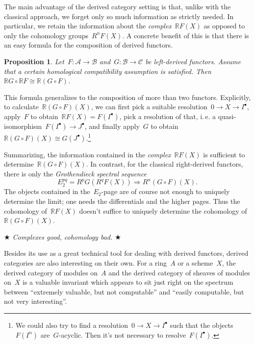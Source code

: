\documentclass{amsart}
\makeatletter
\theoremstyle{definition}
\theoremstyle{plain}
\newtheorem{prop}[defn]{Proposition}
\theoremstyle{remark}
\newcommand{\A}{\mathcal{A}}
\newcommand{\B}{\mathcal{B}}
\newcommand{\C}{\mathcal{C}}
\newcommand{\RR}{\mathbb{R}}
\newcommand{\?}{\,{:}\,}
\renewcommand{\_}{\mathpunct{.}\,}
\newcommand{\ie}{i.\,e.\@\xspace}
\makeatother
\begin{document}
The main advantage of the derived category setting is that, unlike with the
classical approach, we forget only so much information as strictly needed.
In particular, we retain the information about the \emph{complex}~$\RR F(X)$ as
opposed to only the cohomology groups~$R^n F(X)$. A concrete benefit of this is
that there is an easy formula for the composition of derived functors.

\begin{prop}Let~$F : \A \to \B$ and~$G : \B \to \C$ be left-derived functors.
Assume that a certain homological compatibility assumption is satisfied.
Then~$\RR G \circ \RR F \cong \RR (G \circ F)$.\end{prop}

This formula generalizes to the composition of more than two functors.
Explicitly, to calculate~$\RR (G \circ F)(X)$, we can first pick a suitable
resolution~$0 \to X \to I^\bullet$, apply~$F$ to obtain~$\RR F(X) =
F(I^\bullet)$, pick a resolution of that, \ie a quasi-isomorphism~$F(I^\bullet)
\to J^\bullet$, and finally apply~$G$ to obtain~$\RR (G \circ F)(X) \cong
G(J^\bullet)$.\footnote{We could also try to find a resolution~$0 \to X \to
I^\bullet$ such that the objects~$F(I^n)$ are~$G$-acyclic. Then it's not
necessary to resolve~$F(I^\bullet)$.}

Summarizing, the information contained in the \emph{complex}~$\RR F(X)$ is
sufficient to determine~$\RR (G \circ F)(X)$. In contrast, for the classical
right-derived functors, there is only the \emph{Grothendieck spectral sequence}
\[ E_2^{pq} = R^p G(R^q F(X)) \Longrightarrow R^n (G \circ F)(X). \]
The objects contained in the~$E_2$-page are of course not enough to uniquely
determine the limit; one needs the differentials and the higher pages. Thus the
cohomology of~$\RR F(X)$ doesn't suffice to uniquely determine the
cohomology of~$\RR (G \circ F)(X)$.

\begin{center}\emph{$\bigstar$ Complexes good, cohomology bad. $\bigstar$}\end{center}

Besides its use as a great technical tool for dealing with derived functors,
derived categories are also interesting on their own. For a ring~$A$ or a
scheme~$X$, the derived category of modules on~$A$ and the derived category of
sheaves of modules on~$X$ is a valuable invariant which appears to sit just
right on the spectrum between ``extremely valuable, but not computable'' and
``easily computable, but not very interesting''.
\end{document}
